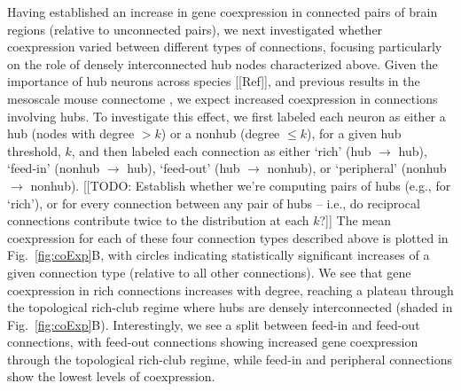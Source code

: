 \documentclass[10pt,letterpaper]{article}
\begin{document}
Having established an increase in gene coexpression in connected pairs of brain regions (relative to unconnected pairs), we next investigated whether coexpression varied between different types of connections, focusing particularly on the role of densely interconnected hub nodes characterized above.
Given the importance of hub neurons across species [[Ref]], and previous results in the mesoscale mouse connectome \cite{Fulcher:2016ck}, we expect increased coexpression in connections involving hubs.
To investigate this effect, we first labeled each neuron as either a hub (nodes with degree $> k$) or a nonhub (degree $\leq k$), for a given hub threshold, $k$, and then labeled each connection as either `rich' (hub $\rightarrow$ hub), `feed-in' (nonhub $\rightarrow$ hub), `feed-out' (hub $\rightarrow$ nonhub), or `peripheral' (nonhub $\rightarrow$ nonhub).
[[TODO: Establish whether we're computing pairs of hubs (e.g., for `rich'), or for every connection between any pair of hubs -- i.e., do reciprocal connections contribute twice to the distribution at each $k$?]]
The mean coexpression for each of these four connection types described above is plotted in Fig.~\ref{fig:coExp}B, with circles indicating statistically significant increases of a given connection type (relative to all other connections). 
We see that gene coexpression in rich connections increases with degree, reaching a plateau through the topological rich-club regime where hubs are densely interconnected (shaded in Fig.~\ref{fig:coExp}B).
Interestingly, we see a split between feed-in and feed-out connections, with feed-out connections showing increased gene coexpression through the topological rich-club regime, while feed-in and peripheral connections show the lowest levels of coexpression.
\end{document}
